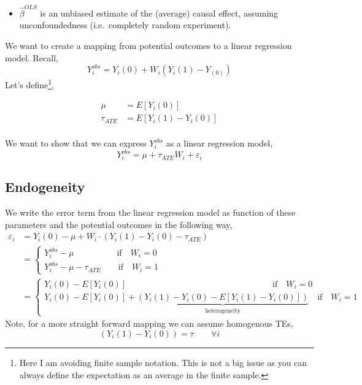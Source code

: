 \documentclass[
  letterpaper,
  DIV=11,
  numbers=noendperiod]{scrreprt}
\providecommand{\tightlist}{%
  \setlength{\itemsep}{0pt}\setlength{\parskip}{0pt}}\usepackage{longtable,booktabs,array}
\theoremstyle{definition}
\theoremstyle{remark}
\begin{document}
\par

\begin{itemize}
\tightlist
\item
  \(\hat{\beta}^{OLS}\) is an unbiased estimate of the (average) causal
  effect, assuming unconfoundedness (i.e.~completely random experiment).
\end{itemize}

We want to create a mapping from potential outcomes to a linear
regression model. Recall, \[
            Y^{obs}_i = Y_i(0)+W_i(Y_i(1)-Y_(0))
\] Let's define\footnote{Here I am avoiding finite sample notation. This
  is not a big issue as you can always define the expectation as an
  average in the finite sample.},

\[
        \begin{align*}
            \mu &=E[Y_i(0)] \\
            \tau_{ATE} &= E[Y_i(1)-Y_i(0)]
        \end{align*}
\]\\
We want to show that we can express \(Y^{obs}_i\) as a linear regression
model, \[
            Y^{obs}_i=\mu+\tau_{ATE}W_i+\varepsilon_i
\]

\hypertarget{endogeneity}{%
\subsection{Endogeneity}\label{endogeneity}}

We write the error term from the linear regression model as function of
these parameters and the potential outcomes in the following way, \[
        \begin{align*}
            \varepsilon_i   &=Y_i(0)- \mu+W_i\cdot(Y_i(1)-Y_i(0)-\tau_{ATE}) \\
                            &=\begin{cases*}
                                Y^{obs}_i-\mu \qquad\qquad\quad \text{if}\quad W_i=0 \\
                                Y^{obs}_i-\mu-\tau_{ATE} \qquad \text{if}\quad W_i=1
                            \end{cases*} \\
                            &=\begin{cases*}
                                Y_i(0)-E[Y_i(0)] \qquad\qquad\qquad\qquad\qquad\qquad\qquad\qquad\quad \text{if}\quad W_i=0 \\
                                Y_i(0)-E[Y_i(0)]+\underbrace{\left(Y_i(1)-Y_i(0)-E[Y_i(1)-Y_i(0)]\right)}_\text{heterogeneity} \quad \text{if}\quad W_i=1
                            \end{cases*}                        
        \end{align*}
\] Note, for a more straight forward mapping we can assume homogenous
TEs, \[
            (Y_i(1)-Y_i(0)) = \tau\qquad \forall i
\]
\end{document}
